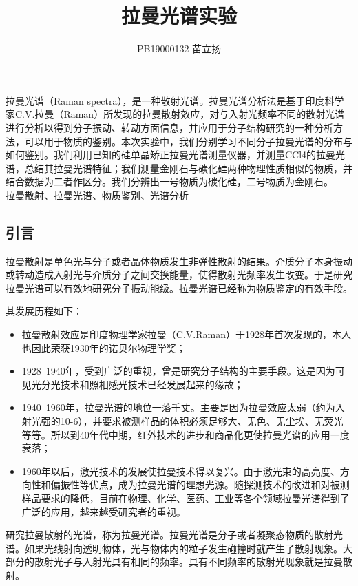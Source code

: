 \documentclass[hyperref]{ctexart}
\title{\textbf{拉曼光谱实验}}
\author{\sffamily PB19000132 苗立扬}
\date{}
\begin{document}
	\maketitle
	拉曼光谱（Raman spectra），是一种散射光谱。拉曼光谱分析法是基于印度科学家C.V.拉曼（Raman）所发现的拉曼散射效应，对与入射光频率不同的散射光谱进行分析以得到分子振动、转动方面信息，并应用于分子结构研究的一种分析方法，可以用于物质的鉴别。本次实验中，我们分别学习不同分子拉曼光谱的分布与如何鉴别。我们利用已知的硅单晶矫正拉曼光谱测量仪器，并测量CCl4的拉曼光谱，总结其拉曼光谱特征；我们测量金刚石与碳化硅两种物理性质相似的物质，并结合数据为二者作区分。我们分辨出一号物质为碳化硅，二号物质为金刚石。\\
	拉曼散射、拉曼光谱、物质鉴别、光谱分析
	\begin{multicols}{2}
		\section{引言}
		
		拉曼散射是单色光与分子或者晶体物质发生非弹性散射的结果。介质分子本身振动或转动造成入射光与介质分子之间交换能量，使得散射光频率发生改变。于是研究拉曼光谱可以有效地研究分子振动能级。拉曼光谱已经称为物质鉴定的有效手段。
		
		其发展历程如下：
		\begin{itemize}
			\item	拉曼散射效应是印度物理学家拉曼（C.V.Raman）于1928年首次发现的，本人也因此荣获1930年的诺贝尔物理学奖；  
			\item	1928~1940年，受到广泛的重视，曾是研究分子结构的主要手段。这是因为可见光分光技术和照相感光技术已经发展起来的缘故；
			\item	1940~1960年，拉曼光谱的地位一落千丈。主要是因为拉曼效应太弱（约为入射光强的10-6），并要求被测样品的体积必须足够大、无色、无尘埃、无荧光等等。所以到40年代中期，红外技术的进步和商品化更使拉曼光谱的应用一度衰落；
			\item	1960年以后，激光技术的发展使拉曼技术得以复兴。由于激光束的高亮度、方向性和偏振性等优点，成为拉曼光谱的理想光源。随探测技术的改进和对被测样品要求的降低，目前在物理、化学、医药、工业等各个领域拉曼光谱得到了广泛的应用，越来越受研究者的重视。
		\end{itemize}
		
		
		研究拉曼散射的光谱，称为拉曼光谱。拉曼光谱是分子或者凝聚态物质的散射光谱。如果光线射向透明物体，光与物体内的粒子发生碰撞时就产生了散射现象。大部分的散射光子与入射光具有相同的频率。具有不同频率的散射光现象就是拉曼散射。
		

\end{multicols}
\end{document}
